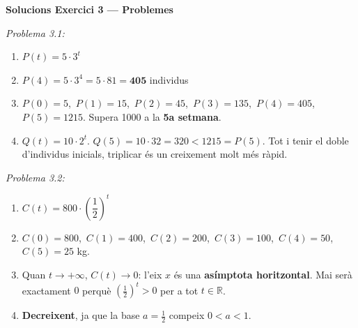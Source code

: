 \documentclass[12pt,a4paper]{article}
\begin{document}
\vspace{0.5cm}

\noindent\textbf{Solucions Exercici 3 --- Problemes}

\vspace{0.2cm}
\noindent\textit{Problema 3.1:}
\begin{enumerate}[label=\alph*), leftmargin=1.5cm, itemsep=0.2cm]
    \item $P(t) = 5 \cdot 3^t$
    \item $P(4) = 5 \cdot 3^4 = 5 \cdot 81 = \mathbf{405}$ individus
    \item $P(0)=5$,\ $P(1)=15$,\ $P(2)=45$,\ $P(3)=135$,\ $P(4)=405$,\ $P(5)=1215$. Supera 1000 a la \textbf{5a setmana}.
    \item $Q(t) = 10 \cdot 2^t$. $Q(5) = 10 \cdot 32 = 320 < 1215 = P(5)$. Tot i tenir el doble d'individus inicials, triplicar \'es un creixement molt m\'es r\`apid.
\end{enumerate}

\vspace{0.3cm}
\noindent\textit{Problema 3.2:}
\begin{enumerate}[label=\alph*), leftmargin=1.5cm, itemsep=0.2cm]
    \item $C(t) = 800 \cdot \left(\dfrac{1}{2}\right)^t$
    \item $C(0)=800$,\ $C(1)=400$,\ $C(2)=200$,\ $C(3)=100$,\ $C(4)=50$,\ $C(5)=25$ kg.
    \item Quan $t \to +\infty$, $C(t) \to 0$: l'eix $x$ \'es una \textbf{as\'imptota horitzontal}. Mai ser\`a exactament $0$ perqu\`e $\left(\frac{1}{2}\right)^t > 0$ per a tot $t \in \mathbb{R}$.
    \item \textbf{Decreixent}, ja que la base $a = \frac{1}{2}$ compeix $0 < a < 1$.
\end{enumerate}
\end{document}
